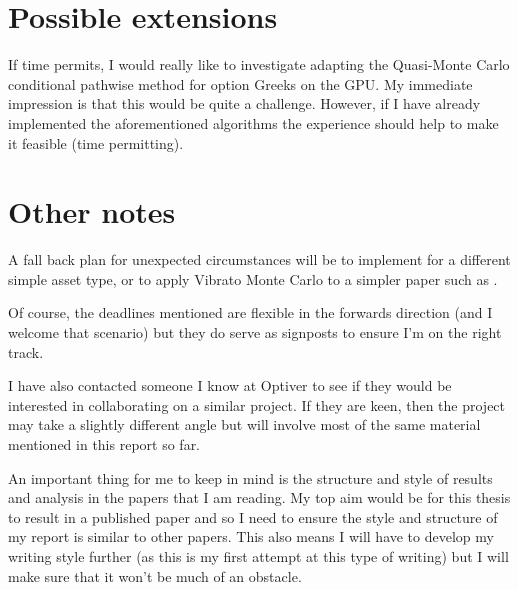 \section{Possible extensions} \label{sec:PossibleExtensions}
If time permits, I would really like to investigate adapting the Quasi-Monte Carlo conditional pathwise method for option Greeks \cite{ZhangConditionalQuasiMonteCarloMethod} on the GPU. My immediate impression is that this would be quite a challenge. However, if I have already implemented the aforementioned algorithms the experience should help to make it feasible (time permitting).

\section{Other notes}
A fall back plan for unexpected circumstances will be to implement \cite{savickas2014super} for a different simple asset type, or to apply Vibrato Monte Carlo to a simpler paper such as \cite{dixon2012monte}.

Of course, the deadlines mentioned are flexible in the forwards direction (and I welcome that scenario) but they do serve as signposts to ensure I'm on the right track.

I have also contacted someone I know at Optiver to see if they would be interested in collaborating on a similar project. If they are keen, then the project may take a slightly different angle but will involve most of the same material mentioned in this report so far.

An important thing for me to keep in mind is the structure and style of results and analysis in the papers that I am reading. My top aim would be for this thesis to result in a published paper and so I need to ensure the style and structure of my report is similar to other papers. This also means I will have to develop my writing style further (as this is my first attempt at this type of writing) but I will make sure that it won't be much of an obstacle.


